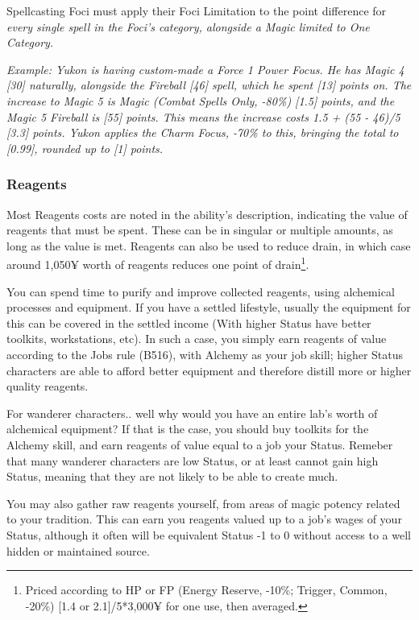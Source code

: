 \begin{multicols*}{2}
	Spellcasting Foci must apply their Foci Limitation to the point difference for \textit{every single spell in the Foci's category, alongside a Magic limited to One Category.}
	
	\textcolor{OliveGreen}{\textit{Example: Yukon is having custom-made a Force 1 Power Focus. He has Magic 4 [30] naturally, alongside the Fireball [46] spell, which he spent [13] points on. The increase to Magic 5 is Magic (Combat Spells Only, -80\%) [1.5] points, and the Magic 5 Fireball is [55] points. This means the increase costs 1.5 + (55 - 46)/5 [3.3] points. Yukon applies the Charm Focus, -70\% to this, bringing the total to [0.99], rounded up to [1] points.}}
	
	\subsubsection{Reagents}
	
	Most Reagents costs are noted in the ability's description, indicating the value of reagents that must be spent. These can be in singular or multiple amounts, as long as the value is met. Reagents can also be used to reduce drain, in which case around 1,050¥ worth of reagents reduces one point of drain\footnote{Priced according to HP or FP (Energy Reserve, -10\%; Trigger, Common, -20\%) [1.4 or 2.1]/5*3,000¥ for one use, then averaged.}.
	
	You can spend time to purify and improve collected reagents, using alchemical processes and equipment. If you have a settled lifestyle, usually the equipment for this can be covered in the settled income (With higher Status have better toolkits, workstations, etc). In such a case, you simply earn reagents of value according to the Jobs rule (B516), with Alchemy as your job skill; higher Status characters are able to afford better equipment and therefore distill more or higher quality reagents. 
	
	For wanderer characters.. well why would you have an entire lab's worth of alchemical equipment? If that is the case, you should buy toolkits for the Alchemy skill, and earn reagents of value equal to a job your Status. Remeber that many wanderer characters are low Status, or at least cannot gain high Status, meaning that they are not likely to be able to create much.
	
	You may also gather raw reagents yourself, from areas of magic potency related to your tradition. This can earn you reagents valued up to a job's wages of your Status, although it often will be equivalent Status -1 to 0 without access to a well hidden or maintained source.
	
\end{multicols*}
